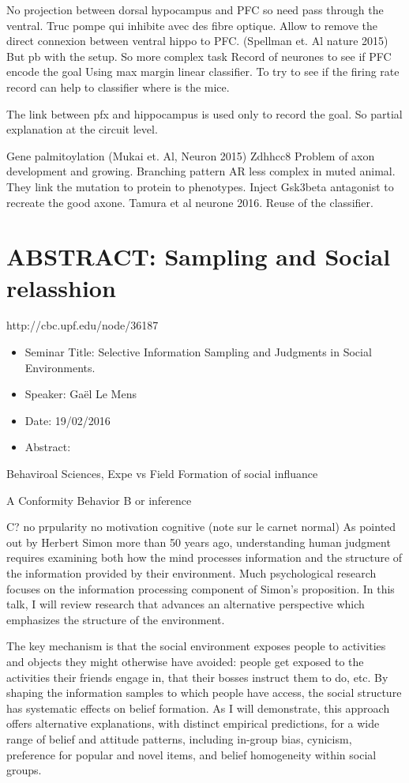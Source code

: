 \documentclass[10pt,letterpaper]{article}
\begin{document}
No projection between dorsal hypocampus and PFC so need pass through the ventral. Truc pompe qui inhibite avec des fibre optique.
Allow to remove the direct connexion between ventral hippo to PFC. (Spellman et. Al nature 2015)
But pb with the setup.
So more complex task
Record of neurones to see if PFC encode the goal
Using max margin linear classifier. To try to see if the firing rate record can help to classifier where is the mice.

The link between pfx and hippocampus is used only to record the goal. So partial explanation at the circuit level.

Gene palmitoylation (Mukai et. Al, Neuron 2015)
Zdhhcc8
Problem of axon development and growing. Branching pattern AR less complex in muted animal. They link the mutation to protein to phenotypes.
Inject Gsk3beta antagonist to recreate the good axone. Tamura et al neurone 2016.
Reuse of the classifier. 


\section{ABSTRACT: Sampling and Social relasshion}
http://cbc.upf.edu/node/36187
\begin{itemize}
    \item Seminar Title: Selective Information Sampling and Judgments in Social Environments.
    \item Speaker: Gaël Le Mens
    \item Date: 19/02/2016
    \item Abstract:
\end{itemize}
Behaviroal Sciences, Expe vs Field
Formation of social influance

A Conformity Behavior
B or inference

C? no prpularity no motivation cognitive
(note sur le carnet normal)
As pointed out by Herbert Simon more than 50 years ago, understanding human judgment requires examining both how the mind processes information and the structure of the information provided by their environment. Much psychological research focuses on the information processing component of Simon’s proposition. In this talk, I will review research that advances an alternative perspective which emphasizes the structure of the environment. 

The key mechanism is that the social environment exposes people to activities and objects they might otherwise have avoided: people get exposed to the activities their friends engage in, that their bosses instruct them to do, etc. By shaping the information samples to which people have access, the social structure has systematic effects on belief formation. As I will demonstrate, this approach offers alternative explanations, with distinct empirical predictions, for a wide range of belief and attitude patterns, including in-group bias, cynicism, preference for popular and novel items, and belief homogeneity within social groups. 
\end{document}
